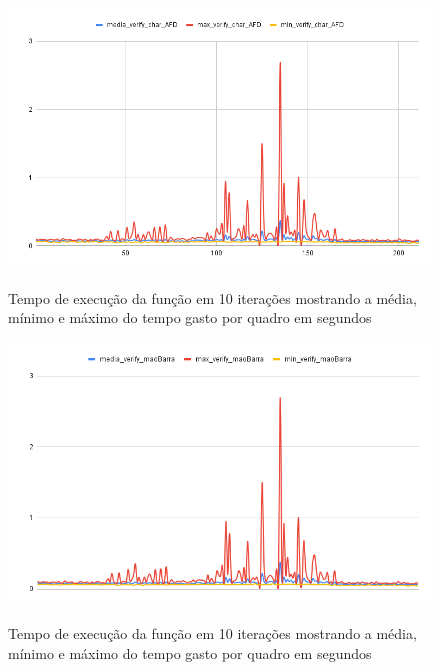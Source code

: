\begin{figure}[H]
	\centering
	\caption{Tempo de execução da função  em 10 iterações mostrando a média, mínimo e máximo do tempo gasto por quadro em segundos}
	\includegraphics[scale=0.55]{figuras/grafico/char_AFD.png}
	\label{graf:G5}
\end{figure}



\begin{figure}[H]
	\centering
	\caption{Tempo de execução da função  em 10 iterações mostrando a média, mínimo e máximo do tempo gasto por quadro em segundos}
	\includegraphics[scale=0.45]{figuras/grafico/maoBarra.png}
	\label{graf:G6}
\end{figure}


